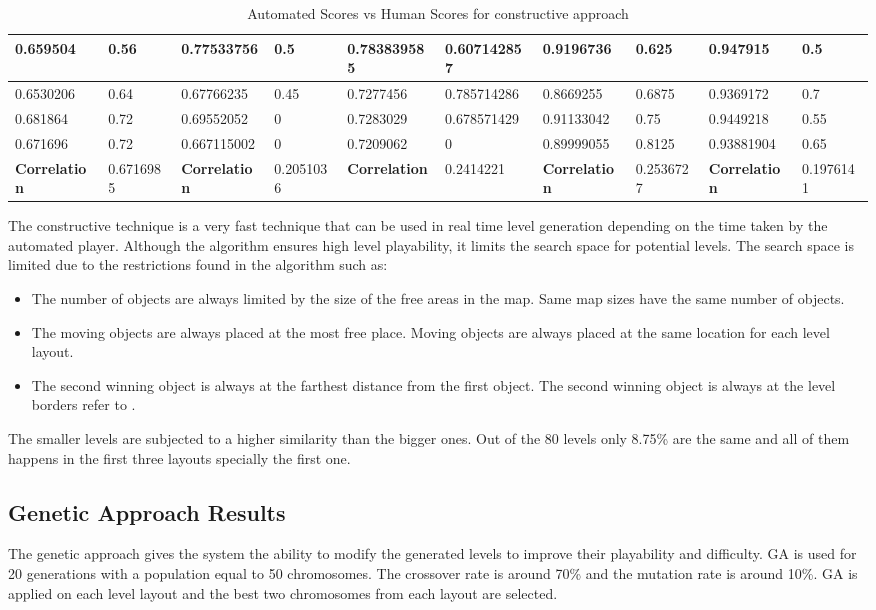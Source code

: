 \begin{landscape}
\begin{table}[!ht]
\begin{tabular}{|p{0.8in}|p{0.8in}|p{0.8in}|p{0.8in}|p{0.8in}|p{0.8in}|p{0.8in}|p{0.8in}|p{0.8in}|p{0.8in}|}
		\hline
		0.659504 & 0.56 & 0.77533756 & 0.5 & 0.783839585 & 0.607142857 & 0.9196736 & 0.625 & 0.947915 & 0.5\\
		\hline
		0.6530206 & 0.64 & 0.67766235 & 0.45 & 0.7277456 & 0.785714286 & 0.8669255 & 0.6875 & 0.9369172 & 0.7\\
		\hline
		0.681864 & 0.72 & 0.69552052 & 0 & 0.7283029 & 0.678571429 & 0.91133042 & 0.75 & 0.9449218 & 0.55\\
		\hline
		0.671696 & 0.72 & 0.667115002 & 0 & 0.7209062 & 0 & 0.89999055 & 0.8125 & 0.93881904 & 0.65\\
		\hline
		\textbf{Correlation} & 0.6716985 & \textbf{Correlation} & 0.2051036 & \textbf{Correlation} & 0.2414221 & \textbf{Correlation} & 0.2536727 & \textbf{Correlation} & 0.1976141\\
		\hline
	\end{tabular}
	\caption{Automated Scores vs Human Scores for constructive approach}
	\label{Table:constructiveScores}
\end{table}
\end{landscape}

The constructive technique is a very fast technique that can be used in real time level generation depending on the time taken by the automated player. Although the algorithm ensures high level playability, it limits the search space for potential levels. The search space is limited due to the restrictions found in the algorithm such as:
\begin{itemize} \itemsep0pt \parskip0pt 
	\item The number of objects are always limited by the size of the free areas in the map. Same map sizes have the same number of objects.
	\item The moving objects are always placed at the most free place. Moving objects are always placed at the same location for each level layout.
	\item The second winning object is always at the farthest distance from the first object. The second winning object is always at the level borders refer to .
\end{itemize}

The smaller levels are subjected to a higher similarity than the bigger ones. Out of the 80 levels only 8.75\% are the same and all of them happens in the first three layouts specially the first one.

\subsection{Genetic Approach Results}
The genetic approach gives the system the ability to modify the generated levels to improve their playability and difficulty. GA is used for 20 generations with a population equal to 50 chromosomes. The crossover rate is around 70\% and the mutation rate is around 10\%. GA is applied on each level layout and the best two chromosomes from each layout are selected.\\\par

